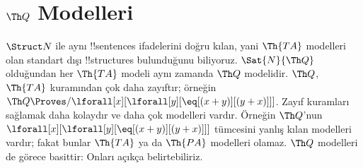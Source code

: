 

\section{$\Th Q$ Modelleri}

\begin{explain}
$\Struct N$ ile aynı !!{sentence}s ifadelerini doğru kılan, yani
$\Th{TA}$ modelleri olan standart dışı !!{structure}s bulunduğunu
biliyoruz. $\Sat{N}{\Th Q}$ olduğundan her $\Th{TA}$ modeli aynı
zamanda $\Th Q$ modelidir. $\Th Q$, $\Th{TA}$ kuramından çok daha
zayıftır; örneğin
$\Th Q\Proves/\lforall[x][\lforall[y][\eq[(x+y)][(y+x)]]]$.
Zayıf kuramları sağlamak daha kolaydır ve daha çok modelleri vardır.
Örneğin $\Th Q$'nun
$\lforall[x][\lforall[y][\eq[(x+y)][(y+x)]]]$ tümcesini yanlış kılan
modelleri vardır; fakat bunlar $\Th{TA}$ ya da $\Th{PA}$ modelleri
olamaz. $\Th Q$ modelleri de görece basittir: Onları açıkça
belirtebiliriz.
\end{explain}

